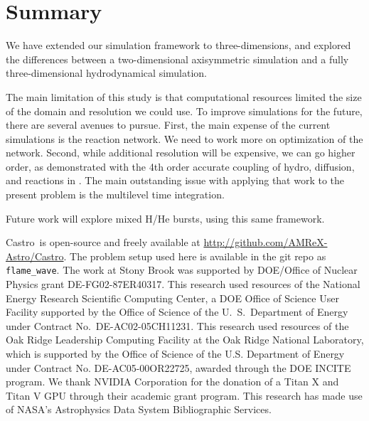 \documentclass[preprint,times,tighten]{aastex631}
\newcommand{\castro}{{\sf Castro}}
\begin{document}
\section{Summary}

We have extended our simulation framework to three-dimensions, and
explored the differences between a two-dimensional axisymmetric
simulation and a fully three-dimensional hydrodynamical simulation.

The main limitation of this study is that computational resources
limited the size of the domain and resolution we could use.  To
improve simulations for the future, there are several avenues to
pursue.  First, the main expense of the current simulations is the
reaction network.  We need to work more on optimization of the
network.  Second, while additional resolution will be expensive, we
can go higher order, as demonstrated with the 4th order accurate
coupling of hydro, diffusion, and reactions in \cite{castro-sdc}.  The
main outstanding issue with applying that work to the present problem
is the multilevel time integration.

Future work will explore mixed H/He bursts, using this same framework.

\begin{acknowledgements}
\castro\ is open-source and freely available at
\url{http://github.com/AMReX-Astro/Castro}.  The problem setup used
here is available in the git repo as {\tt flame\_wave}.  The work at
Stony Brook was supported by DOE/Office of Nuclear Physics grant
DE-FG02-87ER40317.  This research used resources of the National
Energy Research Scientific Computing Center, a DOE Office of Science
User Facility supported by the Office of Science of the
U.~S.\ Department of Energy under Contract No.\ DE-AC02-05CH11231.
This research used resources of the Oak Ridge Leadership Computing
Facility at the Oak Ridge National Laboratory, which is supported by
the Office of Science of the U.S. Department of Energy under Contract
No. DE-AC05-00OR22725, awarded through the DOE INCITE program.  We
thank NVIDIA Corporation for the donation of a Titan X and Titan V GPU
through their academic grant program.  This research has made use of
NASA's Astrophysics Data System Bibliographic Services.
\end{acknowledgements}








\end{document}
